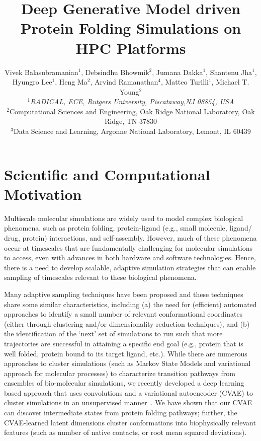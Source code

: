 \documentclass[conference,final]{IEEEtran}
\begin{document}
\title{Deep Generative Model driven Protein Folding Simulations on HPC Platforms}
\author{Vivek Balasubramanian$^{1}$, Debsindhu Bhowmik$^{2}$, Jumana Dakka$^{1}$, Shantenu Jha$^{1}$, \\ Hyungro Lee$^{1}$, Heng Ma$^{2}$, Arvind Ramanathan$^{4}$, Matteo Turilli$^{1}$, Michael T. Young$^{2}$ \\
   {\footnotesize{\emph{$^{1}$RADICAL, ECE, Rutgers University, Piscataway,NJ 08854, USA}}}\\
   \footnotesize{\emph{$^{2}$}}Computational Sciences and Engineering, Oak Ridge National Laboratory, Oak Ridge, TN 37830\\
   \footnotesize{\emph{$^{3}$}}Data Science and Learning, Argonne National Laboratory, Lemont, IL 60439\\
   }


\date{}
\maketitle

\section{Scientific  and Computational Motivation}

Multiscale molecular simulations are widely used to model complex biological phenomena, such as protein folding, protein-ligand (e.g., small molecule, ligand/ drug, protein) interactions, and self-assembly. However, much of these phenomena occur at timescales that are fundamentally challenging for molecular simulations to access, even with advances in both hardware and software technologies. Hence, there is a need to develop scalable, adaptive simulation strategies that can enable sampling of timescales relevant to these biological phenomena. 

Many adaptive sampling techniques have been proposed and these techniques share some similar characteristics, including (a) the need for (efficient) automated approaches to identify a small number of relevant conformational coordinates (either through clustering and/or dimensionality reduction techniques), and (b) the identification of the ‘next’ set of simulations to run such that more trajectories are successful in attaining a specific end goal (e.g., protein that is well folded, protein bound to its target ligand, etc.). While there are numerous approaches to cluster simulations (such as Markov State Models and variational approach for molecular processes) to characterize transition pathways from ensembles of bio-molecular simulations, we recently developed a deep learning based approach that uses convolutions and a variational autoencoder (CVAE) to cluster simulations in an unsupervised manner~\cite{bhowmik2018deep}. We have shown that our CVAE can discover intermediate states from protein folding pathways; further, the CVAE-learned latent dimensions cluster conformations into biophysically relevant features (such as number of native contacts, or root mean squared deviations). 
\end{document}
